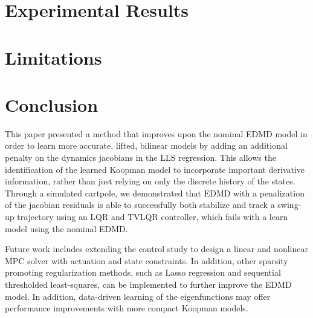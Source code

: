 \documentclass{article}
\begin{document}

\section{Experimental Results}
\label{sec:comparisons}



\section{Limitations} \label{sec:limitations} %


\section{Conclusion}
\label{sec:conclusion}

    This paper presented a method that improves upon the nominal EDMD model in order to learn more accurate, lifted, bilinear models by adding an additional penalty on the dynamics jacobians in the LLS regression. This allows the identification of the learned Koopman model to incorporate important derivative information, rather than just relying on only the discrete history of the states. Through a simulated cartpole, we demonstrated that EDMD with a penalization of the jacobian residuals is able to successfully both stabilize and track a swing-up trajectory using an LQR and TVLQR controller, which fails with a learn model using the nominal EDMD.
    
    Future work includes extending the control study to design a linear and nonlinear MPC solver with actuation and state constraints. In addition, other sparsity promoting regularization methods, such as Lasso regression and sequential thresholded least-squares, can be implemented to further improve the EDMD model. In addition, data-driven learning of the eigenfunctions may offer performance improvements with more compact Koopman models.
    

\clearpage
\end{document}
